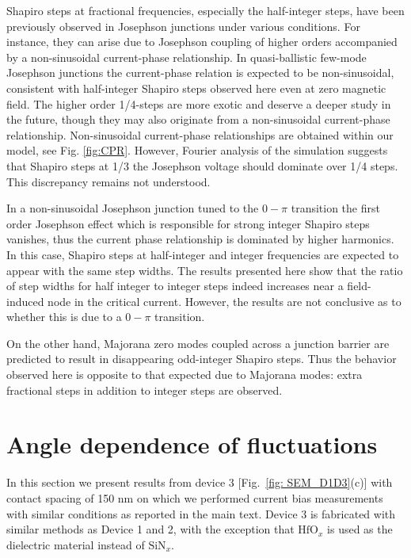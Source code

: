 \documentclass[english, aps,prb,showpacs,preprintnumber,amsmath,amssymb,superscriptaddress,reprint]{revtex4-1}
\begin{document}
Shapiro steps at fractional frequencies, especially the half-integer steps, have been previously observed in Josephson junctions under various conditions\cite{Lehnert1999fractional,Dubos2001fractional, dinsmore2008fractional,PhysRevLett.92.257005,PhysRevLett.97.067006}. 
For instance, they can arise due to Josephson coupling of higher orders accompanied by a non-sinusoidal current-phase relationship\cite{PhysRevB.63.214512}. 
In quasi-ballistic few-mode Josephson junctions the current-phase relation is expected to be non-sinusoidal, consistent with half-integer Shapiro steps observed here even at zero magnetic field. 
The higher order 1/4-steps are more exotic and deserve a deeper study in the future, though they may also originate from a non-sinusoidal current-phase relationship. 
Non-sinusoidal current-phase relationships are obtained within our model, see Fig. \ref{fig:CPR}. However, Fourier analysis of the simulation suggests that Shapiro steps at 1/3 the Josephson voltage should dominate over 1/4 steps. This discrepancy remains not understood.

In a non-sinusoidal Josephson junction tuned to the $0-\pi$ transition the first order Josephson effect which is responsible for strong integer Shapiro steps vanishes, thus the current phase relationship is dominated by higher harmonics. 
In this case, Shapiro steps at half-integer and integer frequencies are expected to appear with the same step widths. 
The results presented here show that the ratio of step widths for half integer to integer steps indeed increases near a field-induced node in the critical current. However, the results are not conclusive as to whether this is due to a $0-\pi$ transition.

On the other hand, Majorana zero modes coupled across a junction barrier are predicted to result in disappearing odd-integer Shapiro steps\cite{lutchyn2010majorana,oreg2010helical}. 
Thus the behavior observed here is opposite to that expected due to Majorana modes: extra fractional steps in addition to integer steps are observed.

\newpage
\section{Angle dependence of fluctuations}
\onecolumngrid
In this section we present results from device 3 [Fig.~\ref{fig: SEM_D1D3}(c)] with contact spacing of 150 nm on which we performed current bias measurements with similar conditions as reported in the main text. 
Device 3 is fabricated with similar methods as Device 1 and 2, with the exception that $\text{HfO}_x$ is used as the dielectric material instead of $\text{SiN}_x$.
\end{document}
